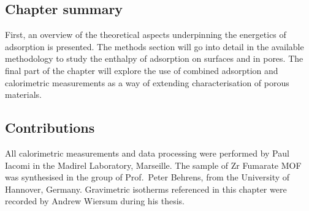 \subsection*{Chapter summary}

First, an overview of the theoretical aspects underpinning
the energetics of adsorption is presented. The methods
section will go into detail in the available methodology
to study the enthalpy of adsorption on surfaces and in
pores. The final part of the chapter will explore the use
of combined adsorption and calorimetric measurements
as a way of extending characterisation of porous materials.

\subsection*{Contributions}

All calorimetric measurements and data processing were
performed by Paul Iacomi in the Madirel Laboratory, Marseille.
The sample of Zr Fumarate \gls{MOF} was synthesised in the group
of Prof.\ Peter Behrens, from the University of Hannover,
Germany. Gravimetric isotherms referenced in this chapter were
recorded by Andrew Wiersum during his thesis.